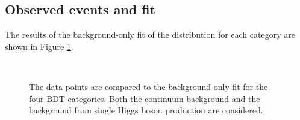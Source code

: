 \subsection{Observed events and \myy fit}
\label{HHyybb:Results:Fit}
The results of the background-only fit of the \myy distribution for each category are shown in Figure \ref{fig:HHyybb:Results:Fit:myy}. 
\begin{figure}[htbp]
    \centering
     \\
    \caption{The data points are compared to the background-only fit for the four BDT categories. Both the continuum background and the background from single Higgs boson production are considered.}
    \label{fig:HHyybb:Results:Fit:myy}
\end{figure}
